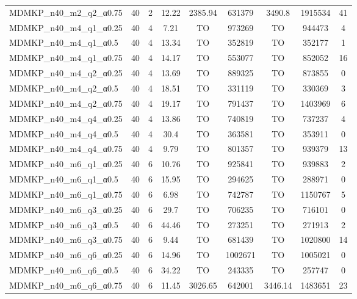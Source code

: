 \begin{table}[!ht]
{\begin{tabular}{lcccccccc}
MDMKP\_n40\_m2\_q2\_α0.75 & 40 & 2 &  \textcolor{blue2}{12.22} & 2385.94 & 631379 & 3490.8 & 1915534 & 41 \\
MDMKP\_n40\_m4\_q1\_α0.25 & 40 & 4 &  \textcolor{blue2}{7.21} & TO & 973269 & TO & 944473 & 4 \\
MDMKP\_n40\_m4\_q1\_α0.5 & 40 & 4 &  \textcolor{blue2}{13.34} & TO & 352819 & TO & 352177 & 1 \\
MDMKP\_n40\_m4\_q1\_α0.75 & 40 & 4 &  \textcolor{blue2}{14.17} & TO & 553077 & TO & 852052 & 16 \\
MDMKP\_n40\_m4\_q2\_α0.25 & 40 & 4 &  \textcolor{blue2}{13.69} & TO & 889325 & TO & 873855 & 0 \\
MDMKP\_n40\_m4\_q2\_α0.5 & 40 & 4 &  \textcolor{blue2}{18.51} & TO & 331119 & TO & 330369 & 3 \\
MDMKP\_n40\_m4\_q2\_α0.75 & 40 & 4 &  \textcolor{blue2}{19.17} & TO & 791437 & TO & 1403969 & 6 \\
MDMKP\_n40\_m4\_q4\_α0.25 & 40 & 4 &  \textcolor{blue2}{13.86} & TO & 740819 & TO & 737237 & 4 \\
MDMKP\_n40\_m4\_q4\_α0.5 & 40 & 4 &  \textcolor{blue2}{30.4} & TO & 363581 & TO & 353911 & 0 \\
MDMKP\_n40\_m4\_q4\_α0.75 & 40 & 4 &  \textcolor{blue2}{9.79} & TO & 801357 & TO & 939379 & 13 \\
MDMKP\_n40\_m6\_q1\_α0.25 & 40 & 6 &  \textcolor{blue2}{10.76} & TO & 925841 & TO & 939883 & 2 \\
MDMKP\_n40\_m6\_q1\_α0.5 & 40 & 6 &  \textcolor{blue2}{15.95} & TO & 294625 & TO & 288971 & 0 \\
MDMKP\_n40\_m6\_q1\_α0.75 & 40 & 6 &  \textcolor{blue2}{6.98} & TO & 742787 & TO & 1150767 & 5 \\
MDMKP\_n40\_m6\_q3\_α0.25 & 40 & 6 &  \textcolor{blue2}{29.7} & TO & 706235 & TO & 716101 & 0 \\
MDMKP\_n40\_m6\_q3\_α0.5 & 40 & 6 &  \textcolor{blue2}{44.46} & TO & 273251 & TO & 271913 & 2 \\
MDMKP\_n40\_m6\_q3\_α0.75 & 40 & 6 &  \textcolor{blue2}{9.44} & TO & 681439 & TO & 1020800 & 14 \\
MDMKP\_n40\_m6\_q6\_α0.25 & 40 & 6 &  \textcolor{blue2}{14.96} & TO & 1002671 & TO & 1005021 & 0 \\
MDMKP\_n40\_m6\_q6\_α0.5 & 40 & 6 &  \textcolor{blue2}{34.22} & TO & 243335 & TO & 257747 & 0 \\
MDMKP\_n40\_m6\_q6\_α0.75 & 40 & 6 &  \textcolor{blue2}{11.45} & 3026.65 & 642001 & 3446.14 & 1483651 & 23 \\

\end{tabular}}
\end{table}
